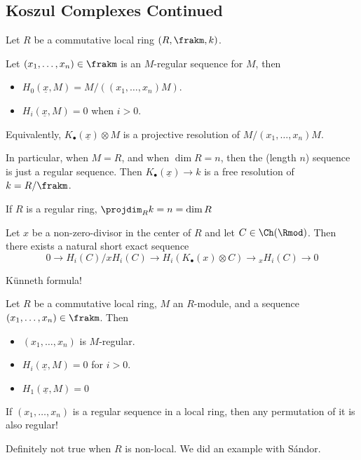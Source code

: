 \documentclass[12pt]{article}
\begin{document}
\subsection{Koszul Complexes Continued}
Let $R$ be a commutative local ring $(R,\frakm,k)$. 
\begin{thm}
	Let $(x_1,\dots,x_n)\in \frakm$ is an $M$-regular sequence for $M$, then
	\begin{itemize}
		\item $H_0(\underline{x},M)=M/((x_1,\dots,x_n)M)$.
		\item $H_i(\underline{x},M)=0$ when $i>0$.
	\end{itemize}
\end{thm}
\begin{rmk}
	Equivalently, $K_\bullet(\underline{x})\otimes M$ is a projective resolution of $M/(x_1,\dots,x_n)M$.
\end{rmk}
In particular, when $M=R$, and when $\dim R=n$, then the (length $n$) sequence is just a regular sequence. Then $K_\bullet(\underline{x})\to k$ is a free resolution of $k=R/\frakm$.
\begin{cor}
	If $R$ is a regular ring, $\projdim_Rk=n=\dim R$
\end{cor}
\begin{lem}
	Let $x$ be a non-zero-divisor in the center of $R$ and let $C\in\Ch(\Rmod)$. Then there 
	exists a natural short exact sequence
	\[0\to H_i(C)/xH_i(C)\to H_i(K_\bullet(x)\otimes C)\to {_x}H_i(C)\to 0\]
\end{lem}
\begin{prf}
	K\"unneth formula!
\end{prf}
\begin{thm}
	Let $R$ be a commutative local ring, $M$ an $R$-module, and a sequence $(x_1,\dots,x_n)\in\frakm$. Then 
	\begin{itemize}
		\item $(x_1,\dots,x_n)$ is $M$-regular.
		\item $H_i(\underline{x},M)=0$ for $i>0$.
		\item $H_1(\underline{x},M)=0$
	\end{itemize}
\end{thm}
\begin{cor}
	If $(x_1,\dots,x_n)$ is a regular sequence in a local ring, then any permutation of it is also regular!
\end{cor}
\begin{rmk}
	Definitely not true when $R$ is non-local. We did an example with S\'andor.
\end{rmk}
\end{document}
